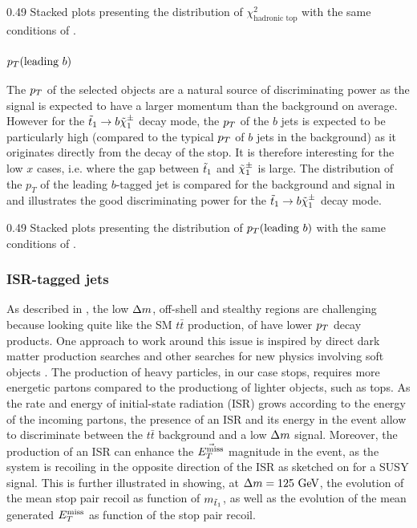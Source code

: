                  {0.49}
                 {Stacked plots presenting the distribution of
                 $\chi^2_\text{hadronic top}$ with the same conditions of
                 .}

    \subsubsection{$p_T(\text{leading } b)$}

    The $p_T$ of the selected objects are a natural source of discriminating
    power as the signal is expected to have a larger momentum than the
    background on average.  However for the $\tilde{t}_1 \rightarrow b \tilde{\chi}_1^\pm$
    decay mode, the $p_T$ of the $b$ jets is expected to be particularly high
    (compared to the typical $p_T$ of $b$ jets in the background) as it
    originates directly from the decay of the stop. It is therefore interesting
    for the low $x$ cases, i.e. where the gap between $\tilde{t}_1$ and $\tilde{\chi}_1^\pm$
    is large. The distribution of the $p_T$ of the leading $b$-tagged jet is
    compared for the background and signal in 
    and illustrates the good discriminating power for the $\tilde{t}_1 \rightarrow b
    \tilde{\chi}_1^\pm$ decay mode.

                 {0.49}
                 {Stacked plots presenting the distribution of
                 $p_T(\text{leading } b)$ with the same conditions of
                 .}

    \subsubsection{ISR-tagged jets \label{sec:ISRjets}}

    As described in , the low
    $\Delta m$, off-shell and stealthy regions are challenging because looking
    quite like the SM $t\bar{t}$ production, of have lower $p_T$ decay products.
    One approach to work around this issue is inspired by direct dark matter
    production searches \cite{EXOmonojet} and other searches for new physics
    involving soft objects \cite{SUScompressedStop}. The production of heavy
    particles, in our case stops, requires more energetic partons compared to
    the productiong of lighter objects, such as tops. As the rate and energy of
    initial-state radiation (ISR) grows according to the energy of the incoming
    partons, the presence of an ISR and its energy in the event allow to
    discriminate between the $t\bar{t}$ background and a low $\Delta m$ signal.
    Moreover, the production of an ISR can enhance the $\vec{E_T^\text{miss}}$ magnitude in
    the event, as the system is recoiling in the opposite direction of the ISR
    as sketched on  for a SUSY signal. This is
    further illustrated in  showing, at $\Delta m =
    125~\text{GeV}$, the evolution of the mean stop pair recoil as function of
    $m_{\tilde{t}_1}$, as well as the evolution of the mean generated $E_T^\text{miss}$ as
    function of the stop pair recoil.

